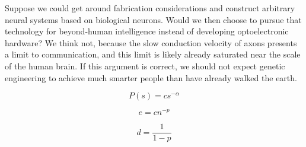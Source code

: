 \documentclass[twocolumn]{article}
\begin{document}
\vspace{4em}
Suppose we could get around fabrication considerations and construct arbitrary neural systems based on biological neurons. Would we then choose to pursue that technology for beyond-human intelligence instead of developing optoelectronic hardware? We think not, because the slow conduction velocity of axons presents a limit to communication, and this limit is likely already saturated near the scale of the human brain. If this argument is correct, we should not expect genetic engineering to achieve much smarter people than have already walked the earth.




\begin{equation}
P(s) = cs^{-\alpha}
\end{equation}

\begin{equation}
e = cn^{-p}
\end{equation}

\begin{equation}
d = \frac{1}{1-p}
\end{equation}

%	


\end{document}
